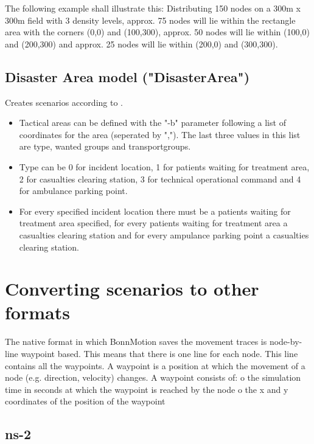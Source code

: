 \documentclass[11pt,a4paper,twoside,normalheadings,headsepline,DIV13,BCOR11mm,openright]{article}
\begin{document}
   The  following  example shall illustrate this: Distributing 150 nodes
   on a 300m x 300m field with 3 density levels, approx. 75  nodes  will
   lie  within  the rectangle area with the corners (0,0) and (100,300),
   approx. 50 nodes will lie within (100,0) and (200,300) and approx. 25
   nodes will lie within (200,0) and (300,300).

\subsection{Disaster Area model ("DisasterArea")}

Creates scenarios according to \cite{NA_MSWIM2007}.

\begin{itemize}
\item Tactical areas can be defined with the "-b" parameter following a
   list  of  coordinates for the area (seperated by ","). The last three
   values in this list are type, wanted groups and transportgroups.  

\item  Type  can  be  0  for  incident  location, 1 for patients waiting for
   treatment  area,  2  for casualties clearing station, 3 for technical
   operational command and 4 for ambulance parking point.
   
\item  For  every  specified  incident  location  there  must  be a patients 
   waiting  for treatment area specified, for every patients waiting for 
   treatment  area a casualties clearing station and for every ampulance 
   parking point a casualties clearing station.
\end{itemize}


\section{Converting scenarios to other formats}

The native format in which BonnMotion saves the movement traces is
node-by-line waypoint based. This means that there is one line for
each node. This line contains all the waypoints. A waypoint is a
position at which the movement of a node (e.g. direction, velocity)
changes. A waypoint consists of:
o  the simulation time in seconds at which the waypoint is reached 
   by the node
o  the x and y coordinates of the position of the waypoint


\subsection{ns-2}
\end{document}
